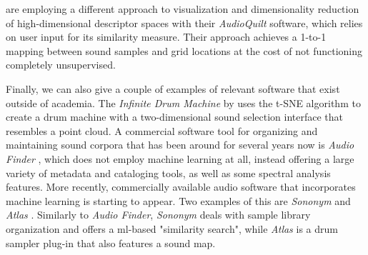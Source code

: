 \smallskip

\citet{fried2014} are employing a different approach to visualization and
dimensionality reduction of high-dimensional descriptor spaces with their
\textit{AudioQuilt} software, which relies on user input for its similarity
measure. Their approach achieves a 1-to-1 mapping between sound samples and
grid locations at the cost of not functioning completely unsupervised.

\smallskip

Finally, we can also give a couple of examples of relevant software that exist
outside of academia. The \textit{Infinite Drum Machine} by \citet{mcdonald2017}
uses the t-SNE algorithm \citep{maaten2008} to create a drum machine with a
two-dimensional sound selection interface that resembles a point cloud. A
commercial software tool for organizing and maintaining sound corpora that has
been around for several years now is \textit{Audio Finder}
\citep{audiofinder2019}, which does not employ machine learning at all, instead
offering a large variety of metadata and cataloging
tools, as well as some spectral analysis features. More recently, commercially
available audio software that incorporates machine learning is starting to
appear. Two examples of this are \textit{Sononym} \citep{nielsen2018} and
\textit{Atlas} \citep{atlas2018}. Similarly to \textit{Audio Finder},
\textit{Sononym} deals with sample library organization and offers a
\gls{ml}-based "similarity search", while \textit{Atlas} is a drum sampler
plug-in that also features a sound map.
